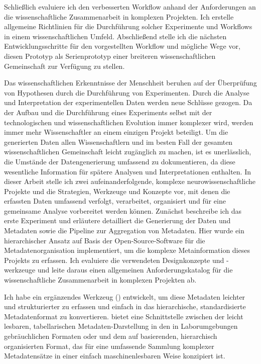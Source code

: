 Schließlich evaluiere ich den verbesserten Workflow anhand der Anforderungen an die wissenschaftliche Zusammenarbeit in komplexen Projekten. Ich erstelle allgemeine Richtlinien für die Durchführung solcher Experimente und Workflows in einem wissenschaftlichen Umfeld. Abschließend stelle ich die nächsten Entwicklungsschritte für den vorgestellten Workflow und mögliche Wege vor, diesen Prototyp als Serienprototyp einer breiteren wissenschaftlichen Gemeinschaft zur Verfügung zu stellen.



Das wissenschaftlichen Erkenntnisse der Menschheit beruhen auf der Überprüfung von Hypothesen durch die Durchführung von Experimenten. Durch die Analyse und Interpretation der experimentellen Daten werden neue Schlüsse gezogen. Da der Aufbau und die Durchführung eines Experiments selbst mit der technologischen und wissenschaftlichen Evolution immer komplexer wird, werden immer mehr Wissenschaftler an einem einzigen Projekt beteiligt. Um die generierten Daten allen Wissenschaftlern und im besten Fall der gesamten wissenschaftlichen Gemeinschaft leicht zugänglich zu machen, ist es unerlässlich, die Umstände der Datengenerierung umfassend zu dokumentieren, da diese wesentliche Information für spätere Analysen und Interpretationen enthalten.
In dieser Arbeit stelle ich zwei aufeinanderfolgende, komplexe neurowissenschaftliche Projekte und die Strategien, Werkzeuge und Konzepte vor, mit denen die erfassten Daten umfassend verfolgt, verarbeitet, organisiert und für eine gemeinsame Analyse vorbereitet werden können. Zunächst beschreibe ich das erste Experiment und erläutere detailliert die Generierung der Daten und Metadaten sowie die Pipeline zur Aggregation von Metadaten. Hier wurde ein hierarchischer Ansatz auf Basis der Open-Source-Software  für die Metadatenorganisation implementiert, um die komplexe Metainformation dieses Projekts zu erfassen. Ich evaluiere die verwendeten Designkonzepte und -werkzeuge und leite daraus einen allgemeinen Anforderungskatalog für die wissenschaftliche Zusammenarbeit in komplexen Projekten ab.

Ich habe ein ergänzendes Werkzeug () entwickelt, um diese Metadaten leichter und strukturierter zu erfassen und einfach in das hierarchische, standardisierte Metadatenformat  zu konvertieren.  bietet eine Schnittstelle zwischen der leicht lesbaren, tabellarischen Metadaten-Darstellung in den in Laborumgebungen gebräuchlichen Formaten  oder  und dem auf  basierenden, hierarchisch organisierten  Format, das für eine umfassende Sammlung komplexer Metadatensätze in einer einfach maschinenlesbaren Weise konzipiert ist.

